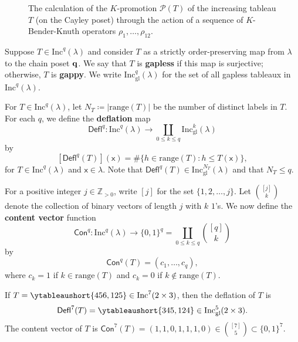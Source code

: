 \documentclass[12pt]{amsart}
\newcommand{\x}{\ensuremath{\mathsf{x}}}
\theoremstyle{definition}
\newenvironment{example}
  {\pushQED{\qed}\renewcommand{\qedsymbol}{$\diamondsuit$}\examplex}
  {\popQED\endexamplex}
\theoremstyle{remark}
\numberwithin{equation}{section}
\newcommand{\inc}{\ensuremath{\mathrm{Inc}}}
\newcommand{\incgl}{\inc_{\mathrm{gl}}}
\newcommand{\pro}{\mathcal{P}}
\newcommand{\deflate}{\ensuremath{\mathsf{Defl}}}
\newcommand{\content}{\ensuremath{\mathsf{Con}}}
\begin{document}
\begin{figure}[h]
\caption{The calculation of the $K$-promotion $\pro(T)$ of the increasing tableau $T$ (on the Cayley poset) through the action of a sequence of $K$-Bender-Knuth operators $\rho_1, \dots, \rho_{12}$.}\label{fig:promotion}
\end{figure}

Suppose $T \in \inc^q(\lambda)$ and consider $T$ as a strictly order-preserving map from $\lambda$ to the chain poset ${\bf q}$. We say that $T$ is {\bf gapless} if this map is surjective; otherwise, $T$ is {\bf gappy}. We write $\incgl^q(\lambda)$ for the set of all gapless tableaux in $\inc^q(\lambda)$.

For $T \in \inc^q(\lambda)$, let $N_T \coloneqq |\mathrm{range}(T)|$ be the number of distinct labels in $T$. For each $q$, we define the {\bf deflation} map \[\deflate^q : \inc^q(\lambda) \to \coprod_{0 \leq k \leq q} \incgl^k(\lambda)\] by
\[
[\deflate^q(T)](\x) =
\# \{ h \in \mathrm{range}(T): h \leq T(\x) \} ,
\]
for $T \in \inc^q(\lambda)$ and $\x \in \lambda$. Note that $\deflate^q(T) \in \incgl^{N_T}(\lambda)$ and that $N_T \leq q$.

For a positive integer $j \in \mathbb{Z}_{>0}$, write $[j]$ for the set $\{ 1, 2, \dots, j\}$. Let $\binom{[j]}{k}$ denote the collection of binary vectors of length $j$ with $k$ $1$'s. We now define the {\bf content vector} function 
\[
 \content^q : \inc^q(\lambda) \to \{ 0, 1\}^q = \coprod_{0 \leq  k \leq q} \binom{[q]}{k}
 \] 
 by 
\[
\content^q(T) = (c_1, \dots, c_q),
\] 
where $c_k = 1$ if $k \in \mathrm{range}(T)$ and $c_k = 0$ if $k \notin \mathrm{range}(T)$.

\begin{example}\label{ex:deflate}
If $T = \ytableaushort{456,125} \in \inc^7(2 \times 3)$, then the deflation of $T$ is \[\deflate^7(T) = \ytableaushort{345,124} \in \incgl^5(2 \times 3).\] The content vector of $T$ is $\content^7(T) = (1,1,0,1,1,1,0) \in \binom{[7]}{5} \subset \{0,1\}^7$.
\end{example}
\end{document}

